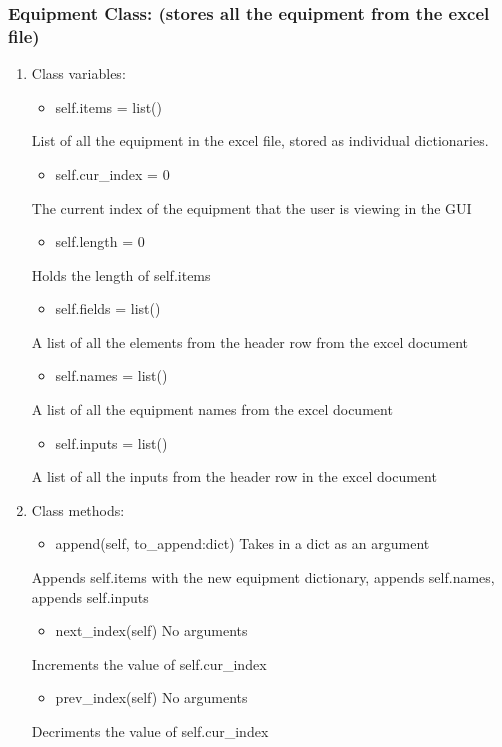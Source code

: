\documentclass[11pt]{article}
\begin{document}
\subsubsection{Equipment Class: (stores all the equipment from the excel file)}
\label{sec:orgc63ce3f}
\begin{enumerate}
\item Class variables:
\label{sec:org1806f12}
\begin{itemize}
\item self.items = list()
\end{itemize}
List of all the equipment in the excel file, stored as individual dictionaries.

\begin{itemize}
\item self.cur\_index = 0
\end{itemize}
The current index of the equipment that the user is viewing in the GUI

\begin{itemize}
\item self.length = 0
\end{itemize}
Holds the length of self.items

\begin{itemize}
\item self.fields = list()
\end{itemize}
A list of all the elements from the header row from the excel document

\begin{itemize}
\item self.names = list()
\end{itemize}
A list of all the equipment names from the excel document

\begin{itemize}
\item self.inputs = list()
\end{itemize}
A list of all the inputs from the header row in the excel document

\item Class methods:
\label{sec:org134d424}

\begin{itemize}
\item append(self, to\_append:dict) Takes in a dict as an argument
\end{itemize}
Appends self.items with the new equipment dictionary, appends self.names, appends self.inputs

\begin{itemize}
\item next\_index(self) No arguments
\end{itemize}
Increments the value of self.cur\_index

\begin{itemize}
\item prev\_index(self) No arguments
\end{itemize}
Decriments the value of self.cur\_index
\end{enumerate}
\end{document}
